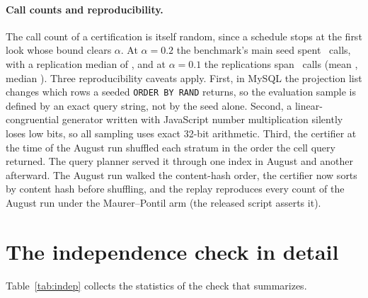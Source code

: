 \paragraph{Call counts and reproducibility.} The call count of a
certification is itself random, since a schedule stops at the first
look whose bound clears $\alpha$. At $\alpha{=}0.2$ the benchmark's
main seed spent \benchOracleMain\ calls, with a replication median of
\benchOracleMedian, and at $\alpha{=}0.1$ the replications span
\benchOracleTightRange\ calls (mean \benchOracleTightMean, median
\benchOracleTightMedian). Three reproducibility caveats apply. First, in MySQL the projection
list changes which rows a seeded \texttt{ORDER BY RAND} returns, so the
evaluation sample is defined by an exact query string, not by the seed
alone. Second, a linear-congruential generator written with JavaScript number
multiplication silently loses low bits, so all sampling uses exact
32-bit arithmetic. Third, the certifier at the time of the August run shuffled each stratum
in the order the cell query returned. The query planner served it
through one index in August and another afterward. The August run
walked the content-hash order, the certifier now sorts by content hash
before shuffling, and the replay reproduces every count of the August run
under the Maurer--Pontil arm (the released script asserts it).
\par

\ifnum{}\relax
\FloatBarrier
\keepheading
\section{The independence check in detail}
\label{app:indep}
Table~\ref{tab:indep} collects the statistics of the check that
 summarizes.

